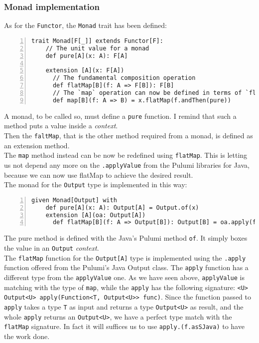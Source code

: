 \subsubsection{Monad implementation}
As for the \texttt{Functor}, the \texttt{Monad} trait has been defined:\\
\begin{minipage}{\linewidth}
\begin{lstlisting}[numbers=left, numberstyle=\tiny, numbersep=-5pt, stepnumber=1, linewidth=420pt]
  trait Monad[F[_]] extends Functor[F]:
    // The unit value for a monad
    def pure[A](x: A): F[A]

    extension [A](x: F[A])
      // The fundamental composition operation
      def flatMap[B](f: A => F[B]): F[B]
      // The `map` operation can now be defined in terms of `flatMap`
      def map[B](f: A => B) = x.flatMap(f.andThen(pure))
\end{lstlisting}
\end{minipage}
A monad, to be called so, must define a \texttt{pure} function.
I remind that such a method puts a value inside a \textit{context}.\\
Then the \texttt{faltMap}, that is the other method required from a monad, is defined as an extension method.\\
The \texttt{map} method instead can be now be redefined using \texttt{flatMap}.
This is letting us not depend any more on the \texttt{.applyValue} from the Pulumi libraries for Java, because we can now use flatMap to achieve the desired result.\\
The monad for the \texttt{Output} type is implemented in this way:\\
\begin{minipage}{\linewidth}
\begin{lstlisting}[numbers=left, numberstyle=\tiny, numbersep=-5pt, stepnumber=1, linewidth=420pt]
  given Monad[Output] with
    def pure[A](x: A): Output[A] = Output.of(x)
    extension [A](oa: Output[A])
      def flatMap[B](f: A => Output[B]): Output[B] = oa.apply(f.asJava)
\end{lstlisting}
\end{minipage}
The pure method is defined with the Java's Pulumi method \texttt{of}.
It simply boxes the value in an \texttt{Output} \textit{context}.\\
The \texttt{flatMap} function for the \texttt{Output[A]} type is implemented using the \texttt{.apply} function offered from the Pulumi's Java Output class.
The \texttt{apply} function has a different type from the \texttt{applyValue} one.
As we have seen above, \texttt{applyValue} is matching with the type of \texttt{map}, while the \texttt{apply} has the following signature: \texttt{<U> Output<U> apply(Function<T, Output<U>> func)}.
Since the function passed to \texttt{apply} takes a type \texttt{T} as input and returns a type \texttt{Output<U>} as result, and the whole \texttt{apply} returns an \texttt{Output<U>}, we have a perfect type match with the \texttt{flatMap} signature.
In fact it will suffices us to use \texttt{apply.(f.asSJava)} to have the work done.

